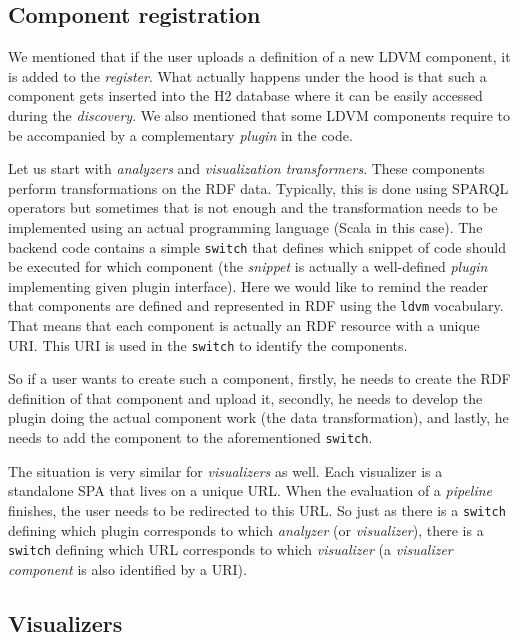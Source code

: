 \subsection{Component registration}
\label{sec:linkedpipes:component_registration}

We mentioned that if the user uploads a definition of a new LDVM component, it is added to the \emph{register}. What actually happens under the hood is that such a component gets inserted into the H2 database where it can be easily accessed during the \emph{discovery}. We also mentioned that some LDVM components require to be accompanied by a complementary \emph{plugin} in the code.

Let us start with \emph{analyzers} and \emph{visualization transformers}. These components perform transformations on the RDF data. Typically, this is done using SPARQL operators but sometimes that is not enough and the transformation needs to be implemented using an actual programming language (Scala in this case). The backend code contains a simple \texttt{switch} that defines which snippet of code should be executed for which component (the \emph{snippet} is actually a well-defined \emph{plugin} implementing given plugin interface). Here we would like to remind the reader that components are defined and represented in RDF using the \texttt{ldvm} vocabulary. That means that each component is actually an RDF resource with a unique URI. This URI is used in the \texttt{switch} to identify the components. 

So if a user wants to create such a component, firstly, he needs to create the RDF definition of that component and upload it, secondly, he needs to develop the plugin doing the actual component work (the data transformation), and lastly, he needs to add the component to the aforementioned \texttt{switch}. 

The situation is very similar for \emph{visualizers} as well. Each visualizer is a standalone SPA that lives on a unique URL. When the evaluation of a \emph{pipeline} finishes, the user needs to be redirected to this URL. So just as there is a \texttt{switch} defining which plugin corresponds to which \emph{analyzer} (or \emph{visualizer}), there is a \texttt{switch} defining which URL corresponds to which \emph{visualizer} (a \emph{visualizer component} is also identified by a URI).

\subsection{Visualizers}
\label{sec:linkedpipes:visualizers}

